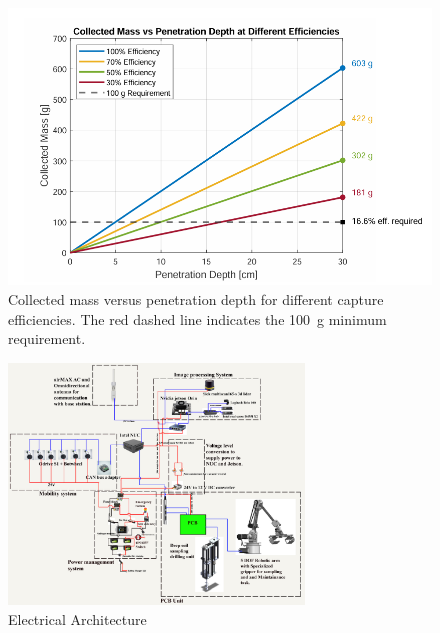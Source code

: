 \documentclass[letterpaper, 10 pt, conference]{ieeeconf}  %
\begin{document}
\begin{figure}[h!]
    \centering
    \includegraphics[width=0.70\linewidth]{mass_vs_efficiency.png}
    \caption{Collected mass versus penetration depth for different capture efficiencies.
    The red dashed line indicates the 100~g minimum requirement.}
    \label{fig:mass_efficiency}
\end{figure}




\begin{figure}
    \centering
    \includegraphics[width=0.7\textwidth]{Elexarch.png}
    \caption{Electrical Architecture}
    \label{elex}
\end{figure}
\end{document}
